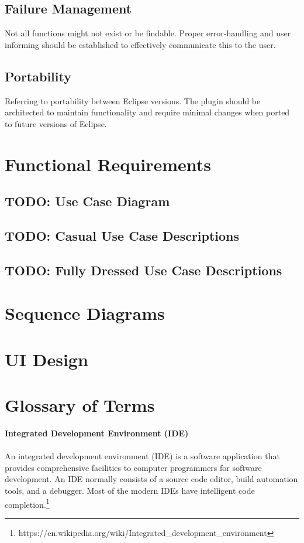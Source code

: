 \documentclass[]{report}
\begin{document}
\section{Failure Management}

Not all functions might not exist or be findable.  Proper error-handling and user informing should be established to effectively communicate this to the user.

\section{Portability}

Referring to portability between Eclipse versions.  The plugin should be architected to maintain functionality and require minimal changes when ported to future versions of Eclipse.

\chapter{Functional Requirements}

\section{TODO: Use Case Diagram}

\section{TODO: Casual Use Case Descriptions}

\section{TODO: Fully Dressed Use Case Descriptions}

\chapter{Sequence Diagrams}

\chapter{UI Design}

\chapter{Glossary of Terms}

\textbf{Integrated Development Environment (IDE)}\\ \\
An integrated development environment (IDE) is a software application that provides comprehensive facilities to computer programmers for software development. An IDE normally consists of a source code editor, build automation tools, and a debugger. Most of the modern IDEs have intelligent code completion.\footnote{https://en.wikipedia.org/wiki/Integrated\_development\_environment}
\end{document}
